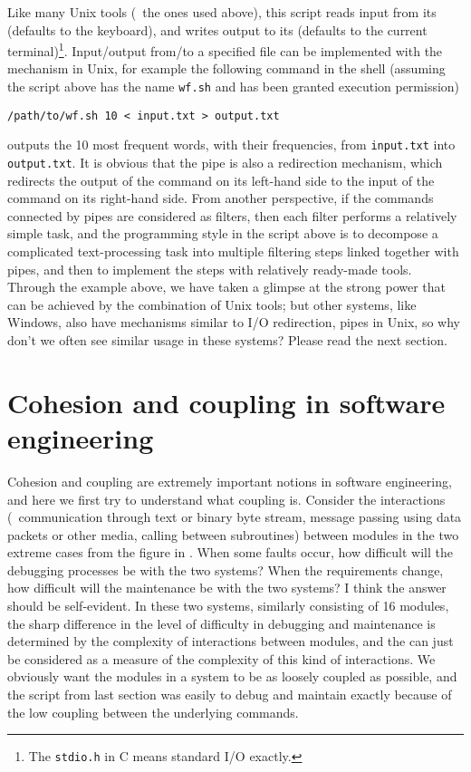 Like many Unix tools (\eg~the ones used above), this script reads input from
its  (defaults to the keyboard), and writes output to
its  (defaults to the current terminal)\footnote{The
\texttt{stdio.h} in C means standard I/O exactly.}.  Input/output from/to a
specified file can be implemented with the  mechanism
in Unix, for example the following command in the shell (assuming the script
above has the name \verb|wf.sh| and has been granted execution permission)
\begin{quoting}
\begin{Verbatim}
/path/to/wf.sh 10 < input.txt > output.txt
\end{Verbatim}
\end{quoting}
outputs the 10 most frequent words, with their frequencies, from
\verb|input.txt| into \verb|output.txt|.  It is obvious that the pipe is also
a redirection mechanism, which redirects the output of the command on its
left-hand side to the input of the command on its right-hand side.  From another
perspective, if the commands connected by pipes are considered as filters, then
each filter performs a relatively simple task, and the programming style in the
script above is to decompose a complicated text-processing task into multiple
filtering steps linked together with pipes, and then to implement the steps
with relatively ready-made tools.  Through the example above, we have taken a
glimpse at the strong power that can be achieved by the combination of Unix
tools; but other systems, like Windows, also have mechanisms similar to I/O
redirection, pipes \etc{} in Unix, so why don't we often see similar
usage in these systems?  Please read the next section.

\section{Cohesion and coupling in software engineering}\label{sec:coupling}

Cohesion and coupling are extremely important notions in software engineering,
and here we first try to understand what coupling is.  Consider the interactions
(\eg~communication through text or binary byte stream, message passing using
data packets or other media, calling between subroutines) between modules in
the two extreme cases from the figure in \parencite{litt2014a}.  When some
faults occur, how difficult will the debugging processes be with the two
systems?  When the requirements change, how difficult will the maintenance be
with the two systems?  I think the answer should be self-evident.  In these two
systems, similarly consisting of 16 modules, the sharp difference in the level
of difficulty in debugging and maintenance is determined by the complexity
of interactions between modules, and the  can just
be considered as a measure of the complexity of this kind of interactions.
We obviously want the modules in a system to be as loosely coupled
as possible, and the script from last section was easily to debug and
maintain exactly because of the low coupling between the underlying commands.

